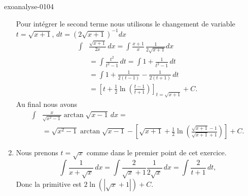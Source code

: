 \begin{corrige}{exoanalyse-0104}
\begin{enumerate}
Pour int\'egrer le second terme nous utilisons le changement de variable $t= \sqrt{x+1}$, $dt = (2\sqrt{x+1})^{-1} dx$ 
\begin{equation*}
  \begin{aligned}
     \int& \frac{\sqrt{x+1}}{2x}\, dx= \int \frac{x+1}{x}\,\frac{1}{2\sqrt{x+1}} dx\\
&= \int \frac{t^2}{t^2-1} \,dt = \int 1+\frac{1}{t^2-1} \,dt\\
&=\int 1+\frac{1}{2(t-1)}-\frac{1}{2(t+1)} \,dt\\
&= \left[t + \frac{1}{2}\ln\left(\frac{t-1}{t+1}\right)\right]_{t=\sqrt{x+1}} + C.
      \end{aligned}
    \end{equation*}
Au final nous avons 
\begin{equation*}
      \begin{aligned}
        \int&  \frac{x}{\sqrt{x^2-1}} \arctan{\sqrt{x-1}}\, dx = \\
&=\sqrt{x^2-1} \arctan{\sqrt{x-1}} - \left[\sqrt{x+1} + \frac{1}{2}\ln\left(\frac{\sqrt{x+1}-1}{\sqrt{x+1}+1}\right)\right] + C.
      \end{aligned}
    \end{equation*}
  \item Nous prenons $t = \sqrt{x}$ comme dans le premier point de cet exercice. \[
\int \frac{1}{x+\sqrt{x}}\, dx = \int \frac{2}{\sqrt{x} +1} \frac{1}{2\sqrt{x}}\, dx = \int  \frac{2}{t +1}  \, dt, 
\]
Donc la primitive est $2\ln(|\sqrt{x} +1|) +C$.
  \end{enumerate}

\end{corrige}

